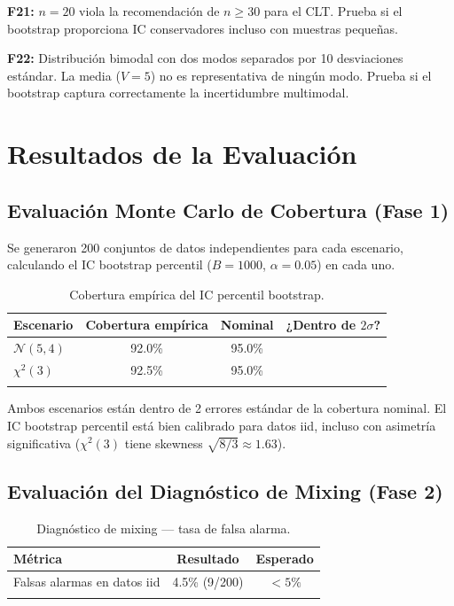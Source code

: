 \documentclass[12pt,a4paper]{article}
\newcommand{\ok}{\textcolor{cbgreen}{\checkmark}}
\begin{document}
\textbf{F21:} $n=20$ viola la recomendación de $n \geq 30$ para el CLT. Prueba si el bootstrap proporciona IC conservadores incluso con muestras pequeñas.

\textbf{F22:} Distribución bimodal con dos modos separados por 10 desviaciones estándar. La media ($V=5$) no es representativa de ningún modo. Prueba si el bootstrap captura correctamente la incertidumbre multimodal.

\section{Resultados de la Evaluación}

\subsection{Evaluación Monte Carlo de Cobertura (Fase 1)}

Se generaron 200 conjuntos de datos independientes para cada escenario, calculando el IC bootstrap percentil ($B=1000$, $\alpha=0.05$) en cada uno.

\begin{longtable}{@{}lccc@{}}
    \toprule
    Escenario & Cobertura empírica & Nominal & ¿Dentro de $2\sigma$? \\
    \midrule
    \endhead
    $\mathcal{N}(5, 4)$ & 92.0\% & 95.0\% & \ok \\
    $\chi^2(3)$ & 92.5\% & 95.0\% & \ok \\
    \bottomrule
    \caption{Cobertura empírica del IC percentil bootstrap.}
\end{longtable}

Ambos escenarios están dentro de 2 errores estándar de la cobertura nominal. El IC bootstrap percentil está bien calibrado para datos iid, incluso con asimetría significativa ($\chi^2(3)$ tiene skewness $\sqrt{8/3} \approx 1.63$).

\subsection{Evaluación del Diagnóstico de Mixing (Fase 2)}

\begin{longtable}{@{}lcc@{}}
    \toprule
    Métrica & Resultado & Esperado \\
    \midrule
    \endhead
    Falsas alarmas en datos iid & 4.5\% (9/200) & $< 5\%$ \\
    \bottomrule
    \caption{Diagnóstico de mixing --- tasa de falsa alarma.}
\end{longtable}
\end{document}
